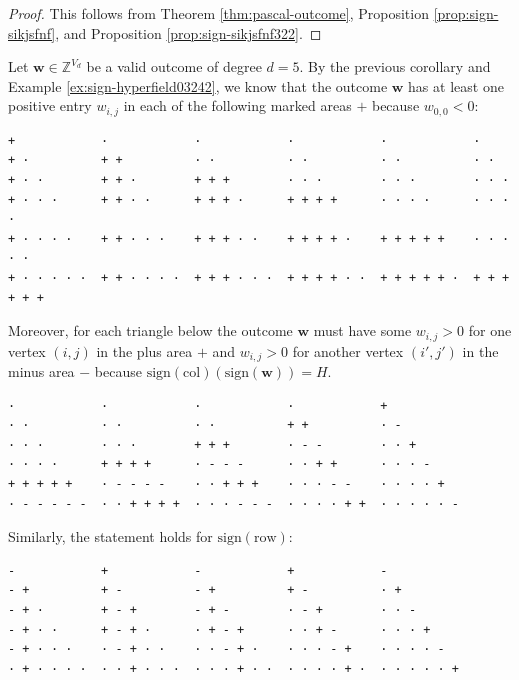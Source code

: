 \begin{proof}
    This follows from Theorem \ref{thm:pascal-outcome}, Proposition \ref{prop:sign-sikjsfnf}, and Proposition \ref{prop:sign-sikjsfnf322}.
\end{proof}

\begin{example}
    Let \( \mathbf{w} \in \mathbb{Z}^{V_d} \) be a valid outcome of degree \( d = 5 \). By the previous corollary and Example \ref{ex:sign-hyperfield03242}, we know that the outcome \( \mathbf{w} \) has at least one positive entry \( w_{i,j} \) in each of the following marked areas \( + \) because \( w_{0,0} < 0 \):
    \begin{verbatim}
+            ·            ·            ·            ·            ·
+ ·          + +          · ·          · ·          · ·          · ·
+ · ·        + + ·        + + +        · · ·        · · ·        · · ·
+ · · ·      + + · ·      + + + ·      + + + +      · · · ·      · · · ·
+ · · · ·    + + · · ·    + + + · ·    + + + + ·    + + + + +    · · · · ·
+ · · · · ·  + + · · · ·  + + + · · ·  + + + + · ·  + + + + + ·  + + + + + +
    \end{verbatim}
    Moreover, for each triangle below the outcome \( \mathbf{w} \) must have some \( w_{i,j} > 0 \) for one vertex \( (i,j) \) in the plus area \( + \) and \( w_{i,j} > 0 \) for another vertex \( (i',j') \) in the minus area \( - \) because \( \mathrm{sign}(\mathrm{col})(\mathrm{sign}(\mathbf{w})) = H \).
    \begin{verbatim}
·            ·            ·            ·            +
· ·          · ·          · ·          + +          · -
· · ·        · · ·        + + +        · - -        · · +
· · · ·      + + + +      · - - -      · · + +      · · · -
+ + + + +    · - - - -    · · + + +    · · · - -    · · · · +
· - - - - -  · · + + + +  · · · - - -  · · · · + +  · · · · · -
\end{verbatim}
    Similarly, the statement holds for \( \mathrm{sign}(\mathrm{row}) \):
    \begin{verbatim}
-            +            -            +            -
- +          + -          - +          + -          · +
- + ·        + - +        - + -        · - +        · · -
- + · ·      + - + ·      · + - +      · · + -      · · · +
- + · · ·    · - + · ·    · · - + ·    · · · - +    · · · · -
· + · · · ·  · · + · · ·  · · · + · ·  · · · · + ·  · · · · · +
    \end{verbatim}
\end{example}

